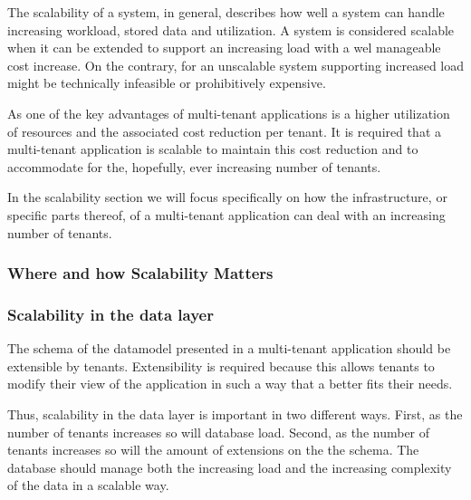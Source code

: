 The scalability of a system, in general, describes how well a system can handle increasing workload, stored data and utilization.
A system is considered scalable when it can be extended to support an increasing load with a wel manageable cost increase.
On the contrary, for an unscalable system supporting increased load might be technically infeasible or prohibitively expensive.\cite{bondi2000scalability}

As one of the key advantages of multi-tenant applications is a higher utilization of resources and the associated cost reduction per tenant.\cite{bezemer2010multi} 
It is required that a multi-tenant application is scalable to maintain this cost reduction and to accommodate for the, hopefully, ever increasing number of tenants.

In the scalability section we will focus specifically on how the infrastructure, or specific parts thereof, of a multi-tenant application can deal with an increasing number of tenants.

\subsubsection{Where and how Scalability Matters}


\subsubsection{Scalability in the data layer}
The schema of the datamodel presented in a multi-tenant application should be extensible by tenants.
Extensibility is required because this allows tenants to modify their view of the application in such a way that a better fits their needs.

Thus, scalability in the data layer is important in two different ways.
First, as the number of tenants increases so will database load.
Second, as the number of tenants increases so will the amount of extensions on the the schema. 
The database should manage both the increasing load and the increasing complexity of the data in a scalable way.

